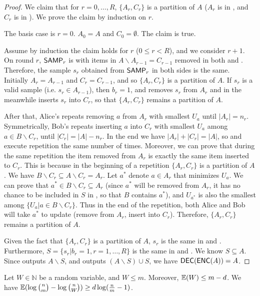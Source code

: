 \begin{proof}
  We claim that for $r=0,\ldots, R$, $\{A_r, C_r\}$ is a partition of $A$ ($A_r$ is in \enc, and $C_r$ is in \dec). We prove the claim by induction on $r$.
  
  The basis case is $r=0$. $A_0=A$ and $C_0=\emptyset$. The claim is true.
  
  Assume by induction the claim holds for $r$ ($0\le r < R$), and we consider $r+1$. 
  On round $r$, $\textsf{SAMP}_r$ is \samp with items in $A\backslash A_{r-1}=C_{r-1}$ removed in both \enc and \dec. Therefore, the sample $s_r$ obtained from $\textsf{SAMP}_r$ in both sides is the same. Initially $A_r=A_{r-1}$ and $C_r=C_{r-1}$, and so $\{A_r,C_r\}$ is a partition of $A$. If $s_r$ is a valid sample (i.e. $s_r\in A_{r-1}$), then $b_r=1$, and \enc removes $s_r$ from $A_r$ and in the meanwhile \dec inserts $s_r$ into $C_r$, so that $\{A_r, C_r\}$ remains a partition of $A$. 
  
  After that, Alice's \enc repeats removing $a$ from $A_r$ with smallest $U_a$ until $|A_r|=n_r$. Symmetrically, Bob's \dec repeats inserting $a$ into $C_r$ with smallest $U_a$ among $a\in B\backslash C_r$, until $|C_r|=|A|-n_r$. In the end we have $|A_r|+|C_r|=|A|$, so \enc and \dec execute repetition the same number of times. Moreover, we can prove that during the same repetition the item removed from $A_r$ is exactly the same item inserted to $C_r$. This is because in the beginning of a repetition $\{A_r, C_r\}$ is a partition of $A$. We have $B\backslash C_r\subseteq A\backslash C_r=A_r$. Let $a^*$ denote  $a\in A_r$ that minimizes $U_a$. We can prove that $a^*\in B\backslash C_r\subseteq A_r$ (since $a^*$ will be removed from $A_r$, it has no chance to be included in $S$ in \enc, so that $B$ contains $a^*$), and $U_{a^*}$ is also the smallest among $\{U_a|a\in B\backslash C_r\}$. Thus in the end of the repetition, both Alice and Bob will take $a^{*}$ to update (remove from $A_r$, insert into $C_r$). Therefore, $\{A_r, C_r\}$ remains a partition of $A$.
  
  Given the fact that $\{A_r, C_r\}$ is a partition of $A$, $s_r$ is the same in \enc and \dec. Furthermore, $S=\{s_r|b_r=1,r=1,\ldots, R\}$ is the same in \enc and \dec. We know $S\subseteq A$. Since \enc outputs $A\backslash S$, and \dec outputs $(A\backslash S)\cup S$, we have $\textsf{DEC}(\textsf{ENC}(A))=A$. 
\end{proof}

\begin{lemma} \label{lemma:bits-saving}
  Let $W\in \mathbb{N}$ be a random variable, and $W\le m$. Moreover, $\operatorname*{\mathbb{E}}(W)\le m-d$. We have $\operatorname*{\mathbb{E}}(\log {n \choose m}-\log {n \choose W})\ge d \log (\frac{n}{m}-1)$.
\end{lemma}

